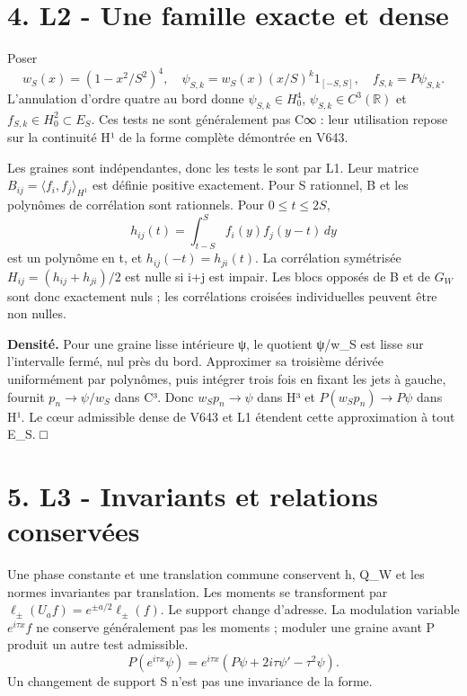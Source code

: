 \documentclass[
  10pt,
  a4paper,
]{article}
\begin{document}
\hypertarget{l2---une-famille-exacte-et-dense}{%
\section{4. L2 - Une famille exacte et
dense}\label{l2---une-famille-exacte-et-dense}}

Poser \[
w_S(x)=(1-x^2/S^2)^4,\quad
\psi_{S,k}=w_S(x)(x/S)^k1_{[-S,S]},\quad f_{S,k}=P\psi_{S,k}.
\] L'annulation d'ordre quatre au bord donne \(\psi_{S,k}\in H_0^4\),
\(\psi_{S,k}\in C^3(\mathbb R)\) et \(f_{S,k}\in H_0^2\subset E_S\). Ces
tests ne sont généralement pas C∞ : leur utilisation repose sur la
continuité H¹ de la forme complète démontrée en V643.

Les graines sont indépendantes, donc les tests le sont par L1. Leur
matrice \(B_{ij}=\langle f_i,f_j\rangle_{H^1}\) est définie positive
exactement. Pour S rationnel, B et les polynômes de corrélation sont
rationnels. Pour \(0\le t\le2S\), \[
h_{ij}(t)=\int_{t-S}^{S}f_i(y)f_j(y-t)\,dy
\] est un polynôme en t, et \(h_{ij}(-t)=h_{ji}(t)\). La corrélation
symétrisée \(H_{ij}=(h_{ij}+h_{ji})/2\) est nulle si i+j est impair. Les
blocs opposés de B et de \(G_W\) sont donc exactement nuls ; les
corrélations croisées individuelles peuvent être non nulles.

\textbf{Densité.} Pour une graine lisse intérieure ψ, le quotient ψ/w\_S
est lisse sur l'intervalle fermé, nul près du bord. Approximer sa
troisième dérivée uniformément par polynômes, puis intégrer trois fois
en fixant les jets à gauche, fournit \(p_n\to\psi/w_S\) dans C³. Donc
\(w_Sp_n\to\psi\) dans H³ et \(P(w_Sp_n)\to P\psi\) dans H¹. Le cœur
admissible dense de V643 et L1 étendent cette approximation à tout E\_S.
□

\hypertarget{l3---invariants-et-relations-conservuxe9es}{%
\section{5. L3 - Invariants et relations
conservées}\label{l3---invariants-et-relations-conservuxe9es}}

Une phase constante et une translation commune conservent h, Q\_W et les
normes invariantes par translation. Les moments se transforment par
\(\ell_\pm(U_af)=e^{\pm a/2}\ell_\pm(f)\). Le support change d'adresse.
La modulation variable \(e^{i\tau x}f\) ne conserve généralement pas les
moments ; moduler une graine avant P produit un autre test admissible.
\[
P(e^{i\tau x}\psi)=e^{i\tau x}(P\psi+2i\tau\psi'-\tau^2\psi).
\] Un changement de support S n'est pas une invariance de la forme.
\end{document}
